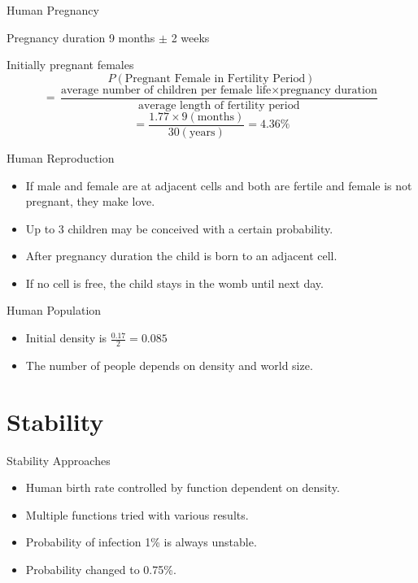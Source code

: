 \documentclass{beamer}
\begin{document}
\begin{frame}{Human Pregnancy}
    \begin{block}{Pregnancy duration}
        9 months $\pm$ 2 weeks
    \end{block}
    \begin{block}{Initially pregnant females}
        $$ P(\text{Pregnant Female in Fertility Period}) $$
        $$ = \frac{\text{average number of children per female life} \times \text{pregnancy duration}}{\text{average length of fertility period}} $$
        $$ = \frac{1.77 \times 9 (\text{months})}{30 (\text{years})} = 4.36\% $$
    \end{block}
\end{frame}

\begin{frame}{Human Reproduction}
    \begin{itemize}
        \item If male and female are at adjacent cells and both are fertile and female is not pregnant, they make love.
        \item Up to 3 children may be conceived with a certain probability.
        \item After pregnancy duration the child is born to an adjacent cell.
        \item If no cell is free, the child stays in the womb until next day. 
    \end{itemize}
\end{frame}

\begin{frame}{Human Population}
    \begin{itemize}
        \item Initial density is $ \frac{0.17}{2} = 0.085 $
        \item The number of people depends on density and world size.
    \end{itemize}
\end{frame}

\section{Stability}

\begin{frame}{Stability Approaches}
    \begin{itemize}
        \item Human birth rate controlled by function dependent on density.
        \item Multiple functions tried with various results.
        \item Probability of infection 1\% is always unstable.
        \item Probability changed to 0.75\%.
    \end{itemize}
\end{frame}
\end{document}
